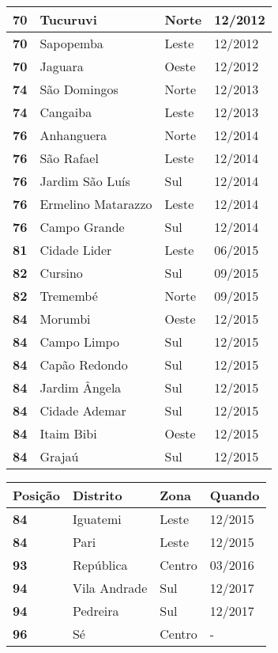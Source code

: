 \begin{table}[H]
\begin{tabular}{l|l|l|l}
		\textbf{70} & Tucuruvi & Norte & 12/2012\\ \hline
		\textbf{70} & Sapopemba & Leste & 12/2012\\ \hline
		\textbf{70} & Jaguara & Oeste & 12/2012\\ \hline
		\textbf{74} & São Domingos & Norte & 12/2013\\ \hline
		\textbf{74} & Cangaiba & Leste & 12/2013\\ \hline
		\textbf{76} & Anhanguera & Norte & 12/2014\\ \hline
		\textbf{76} & São Rafael & Leste & 12/2014\\ \hline
		\textbf{76} & Jardim São Luís & Sul & 12/2014\\ \hline
		\textbf{76} & Ermelino Matarazzo & Leste & 12/2014\\ \hline
		\textbf{76} & Campo Grande & Sul & 12/2014\\ \hline
		\textbf{81} & Cidade Lider & Leste & 06/2015\\ \hline
		\textbf{82} & Cursino & Sul & 09/2015\\ \hline
		\textbf{82} & Tremembé & Norte & 09/2015\\ \hline
		\textbf{84} & Morumbi & Oeste & 12/2015\\ \hline
		\textbf{84} & Campo Limpo & Sul & 12/2015\\ \hline
		\textbf{84} & Capão Redondo & Sul & 12/2015\\ \hline
		\textbf{84} & Jardim Ângela & Sul & 12/2015\\ \hline
		\textbf{84} & Cidade Ademar & Sul & 12/2015\\ \hline
		\textbf{84} & Itaim Bibi & Oeste & 12/2015\\ \hline
		\textbf{84} & Grajaú & Sul & 12/2015\\ 
	\end{tabular}
\end{table}


\begin{table}[H]
	\centering
	\begin{tabular}{l|l|l|l}
		\textbf{Posição} & \textbf{Distrito} & \textbf{Zona} & \textbf{Quando} \\ \hline
		\textbf{84} & Iguatemi & Leste & 12/2015\\ \hline
		\textbf{84} & Pari & Leste & 12/2015\\ \hline
		\textbf{93} & República & Centro & 03/2016\\ \hline
		\textbf{94} & Vila Andrade & Sul & 12/2017\\ \hline
		\textbf{94} & Pedreira & Sul & 12/2017\\ \hline
		\textbf{96} & Sé & Centro & -\\ 
	\end{tabular}
\end{table}

